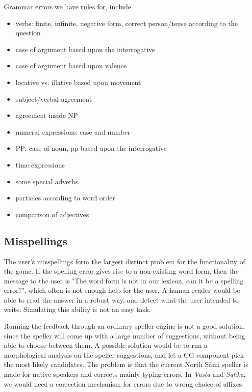 \documentclass[11pt]{article}
\begin{document}
Grammar errors we have rules for, include
\begin{itemize}
\setlength{\itemsep}{-0.2cm}
\item verbs: finite, infinite, negative form, correct person/tense according to the question
\item case of argument based upon the interrogative 
\item case of argument based upon valence
\item locative vs. illative based upon movement
\item subject/verbal agreement
\item agreement inside NP 
\item numeral expressions: case and number 
\item PP: case of noun, pp based upon the interrogative 
\item time expressions 
\item some special adverbs 
\item particles according to word order
\item comparison of adjectives
\end{itemize}

\subsection{Misspellings}
The user's misspellings form the largest distinct problem for the functionality of the game. If the spelling error gives rise to a non-existing word form, then the message to the user is "The word form is not in our lexicon, can it be a spelling error?", which often is not enough help for the user. A human reader would be able to read the answer in a robust way, and detect what the user intended to write. Simulating this ability is not an easy task.
 
Running the feedback through an ordinary speller engine is not a good solution, since the speller will come up with a large number of suggestions, without being able to choose between them. A possible solution would be to run a morphological analysis on the speller suggestions, and let a CG component pick the most likely candidates. The problem is that the current North Sámi speller is made for native speakers and corrects mainly typing errors. In \textit{Vasta} and \textit{Sahka}, we would need a correction mechanism for errors due to wrong choice of affixes.
\end{document}
